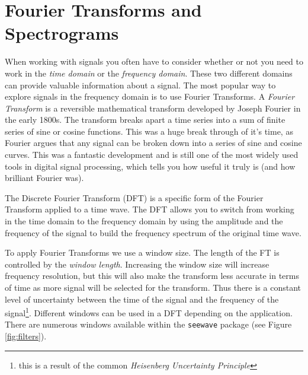 \documentclass[
]{krantz}
\begin{document}
\hypertarget{fourier-transforms-and-spectrograms}{%
\section{Fourier Transforms and Spectrograms}\label{fourier-transforms-and-spectrograms}}

When working with signals you often have to consider whether or not you need to work in the \emph{time domain} or the \emph{frequency domain}. These two different domains can provide valuable information about a signal. The most popular way to explore signals in the frequency domain is to use Fourier Transforms. A \emph{Fourier Transform} is a reversible mathematical transform developed by Joseph Fourier in the early 1800s. The transform breaks apart a time series into a sum of finite series of sine or cosine functions. This was a huge break through of it's time, as Fourier argues that any signal can be broken down into a series of sine and cosine curves. This was a fantastic development and is still one of the most widely used tools in digital signal processing, which tells you how useful it truly is (and how brilliant Fourier was).

The Discrete Fourier Transform (DFT) is a specific form of the Fourier Transform applied to a time wave. The DFT allows you to switch from working in the time domain to the frequency domain by using the amplitude and the frequency of the signal to build the frequency spectrum of the original time wave.

To apply Fourier Transforms we use a window size. The length of the FT is controlled by the \emph{window length}. Increasing the window size will increase frequency resolution, but this will also make the transform less accurate in terms of time as more signal will be selected for the transform. Thus there is a constant level of uncertainty between the time of the signal and the frequency of the signal\footnote{this is a result of the common \emph{Heisenberg Uncertainty Principle}}. Different windows can be used in a DFT depending on the application. There are numerous windows available within the \texttt{seewave} package (see Figure \ref{fig:filters}).
\end{document}
